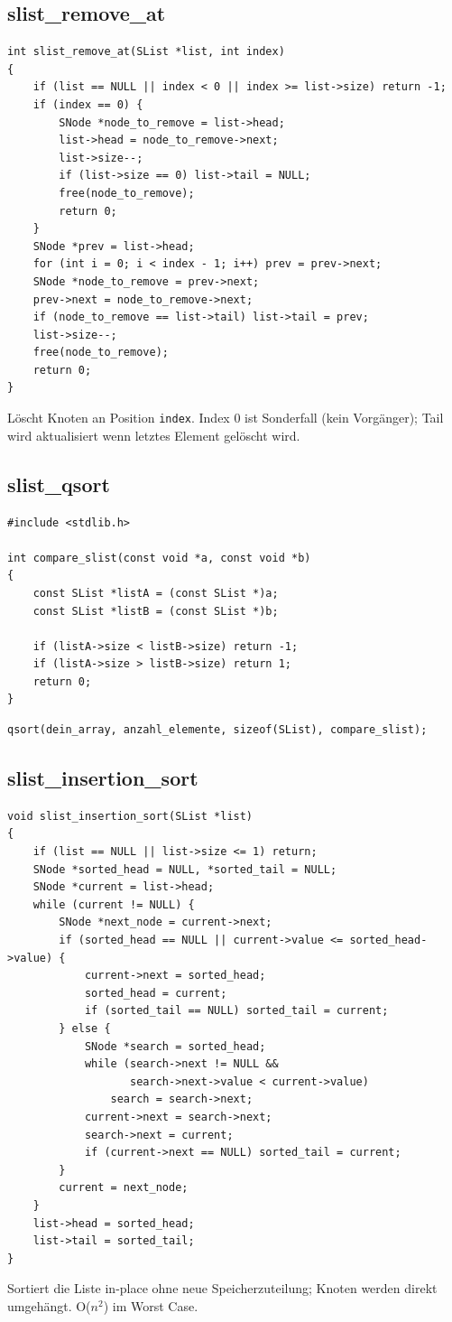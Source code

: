 \documentclass[10pt, a4paper]{article}
\begin{document}
\subsection{slist\_remove\_at}
\begin{lstlisting}
int slist_remove_at(SList *list, int index)
{
    if (list == NULL || index < 0 || index >= list->size) return -1;
    if (index == 0) {
        SNode *node_to_remove = list->head;
        list->head = node_to_remove->next;
        list->size--;
        if (list->size == 0) list->tail = NULL;
        free(node_to_remove);
        return 0;
    }
    SNode *prev = list->head;
    for (int i = 0; i < index - 1; i++) prev = prev->next;
    SNode *node_to_remove = prev->next;
    prev->next = node_to_remove->next;
    if (node_to_remove == list->tail) list->tail = prev;
    list->size--;
    free(node_to_remove);
    return 0;
}
\end{lstlisting}
L\"oscht Knoten an Position \texttt{index}. Index 0 ist Sonderfall (kein Vorg\"anger); Tail wird aktualisiert wenn letztes Element gel\"oscht wird.

\subsection{slist\_qsort}
\begin{lstlisting}
#include <stdlib.h>

int compare_slist(const void *a, const void *b)
{
    const SList *listA = (const SList *)a;
    const SList *listB = (const SList *)b;

    if (listA->size < listB->size) return -1;
    if (listA->size > listB->size) return 1;
    return 0;
}
\end{lstlisting}
\begin{lstlisting}
qsort(dein_array, anzahl_elemente, sizeof(SList), compare_slist);
\end{lstlisting}


\subsection{slist\_insertion\_sort}
\begin{lstlisting}
void slist_insertion_sort(SList *list)
{
    if (list == NULL || list->size <= 1) return;
    SNode *sorted_head = NULL, *sorted_tail = NULL;
    SNode *current = list->head;
    while (current != NULL) {
        SNode *next_node = current->next;
        if (sorted_head == NULL || current->value <= sorted_head->value) {
            current->next = sorted_head;
            sorted_head = current;
            if (sorted_tail == NULL) sorted_tail = current;
        } else {
            SNode *search = sorted_head;
            while (search->next != NULL &&
                   search->next->value < current->value)
                search = search->next;
            current->next = search->next;
            search->next = current;
            if (current->next == NULL) sorted_tail = current;
        }
        current = next_node;
    }
    list->head = sorted_head;
    list->tail = sorted_tail;
}
\end{lstlisting}
Sortiert die Liste in-place ohne neue Speicherzuteilung; Knoten werden direkt umgeh\"angt. O($n^2$) im Worst Case.
\end{document}
